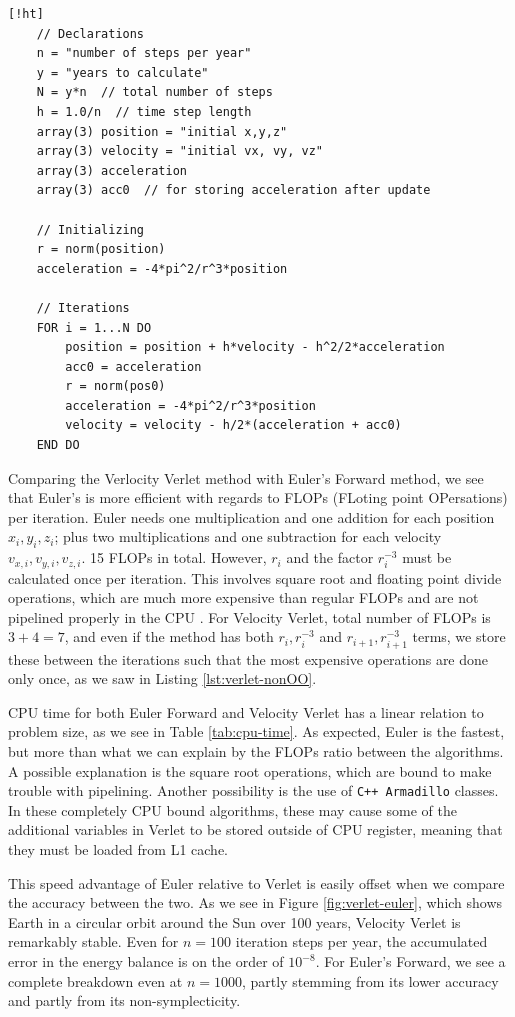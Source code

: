 \documentclass[]{article}
\begin{document}
\begin{lstlisting}[caption={Velocity Verlet algorithm for Sun-Earth system with fixed Sun.},label={lst:verlet-nonOO}] [!ht]
	// Declarations
	n = "number of steps per year"
	y = "years to calculate"
	N = y*n  // total number of steps
	h = 1.0/n  // time step length
	array(3) position = "initial x,y,z"
	array(3) velocity = "initial vx, vy, vz"
	array(3) acceleration
	array(3) acc0  // for storing acceleration after update
	
	// Initializing
	r = norm(position)
	acceleration = -4*pi^2/r^3*position
	
	// Iterations
	FOR i = 1...N DO
		position = position + h*velocity - h^2/2*acceleration
		acc0 = acceleration
		r = norm(pos0)
		acceleration = -4*pi^2/r^3*position
		velocity = velocity - h/2*(acceleration + acc0)
	END DO
\end{lstlisting}

Comparing the Verlocity Verlet method with Euler's Forward method, we see that Euler's is more efficient with regards to FLOPs (FLoting point OPersations) per iteration. Euler needs one multiplication and one addition for each position $x_i, y_i, z_i$; plus two multiplications and one subtraction for each velocity $v_{x,i}, v_{y,i}, v_{z,i}$. 15 FLOPs in total. However, $r_i$ and the factor $r_i^{-3}$ must be calculated once per iteration. This involves square root and floating point divide operations, which are much more expensive than regular FLOPs and are not pipelined properly in the CPU \cite{hager2010introduction}. For Velocity Verlet, total number of FLOPs is $3+4=7$, and even if the method has both $r_i, r_i^{-3}$ and $r_{i+1}, r_{i+1}^{-3}$ terms, we store these between the iterations such that the most expensive operations are done only once, as we saw in Listing \ref{lst:verlet-nonOO}.

CPU time for both Euler Forward and Velocity Verlet has a linear relation to problem size, as we see in Table \ref*{tab:cpu-time}. As expected, Euler is the fastest, but more than what we can explain by the FLOPs ratio between the algorithms. A possible explanation is the square root operations, which are bound to make trouble with pipelining. Another possibility is the use of \lstinline|C++ Armadillo| classes. In these completely CPU bound algorithms, these may cause some of the additional variables in Verlet to be stored outside of CPU register, meaning that they must be loaded from L1 cache.

This speed advantage of Euler relative to Verlet is easily offset when we compare the accuracy between the two. As we see in Figure \ref{fig:verlet-euler}, which shows Earth in a circular orbit around the Sun over 100 years, Velocity Verlet is remarkably stable. Even for $n=100$ iteration steps per year, the accumulated error in the energy balance is on the order of $10^{-8}$. For Euler's Forward, we see a complete breakdown even at $n=1000$, partly stemming from its lower accuracy and partly from its non-symplecticity. 
\end{document}
